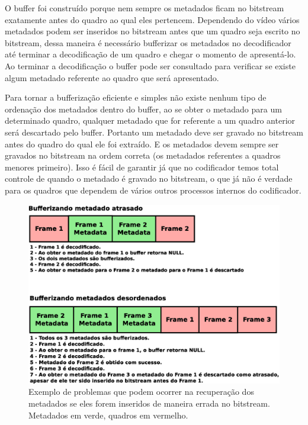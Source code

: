 O buffer foi construído porque nem sempre os metadados ficam no bitstream exatamente antes do quadro ao qual eles pertencem. Dependendo do vídeo vários metadados podem ser inseridos no bitstream antes que um quadro seja escrito no bitstream, dessa maneira é necessário bufferizar os metadados no decodificador até terminar a decodificação de um quadro e chegar o momento de apresentá-lo. Ao terminar a decodificação o buffer pode ser consultado para verificar se existe algum metadado referente ao quadro que será apresentado.

Para tornar a bufferização eficiente e simples não existe nenhum tipo de ordenação dos metadados dentro do buffer, ao se obter o metadado para um determinado quadro, qualquer metadado que for referente a um quadro anterior será descartado pelo buffer. Portanto um metadado deve ser gravado no bitstream antes do quadro do qual ele foi extraído. E os metadados devem sempre ser gravados no bitstream na ordem correta (os metadados referentes a quadros menores primeiro). Isso é fácil de garantir já que no codificador temos total controle de quando o metadado é gravado no bitstream, o que já não é verdade para os quadros que dependem de vários outros processos internos do codificador.

\begin{figure}[H]
\centering
\includegraphics[scale=0.6]{imagens/fig13.eps}
\caption{Exemplo de problemas que podem ocorrer na recuperação dos metadados se eles forem inseridos de maneira errada no bitstream. Metadados em verde, quadros em vermelho.}
\label{fig:bad_metadada_ordering}
\end{figure}

